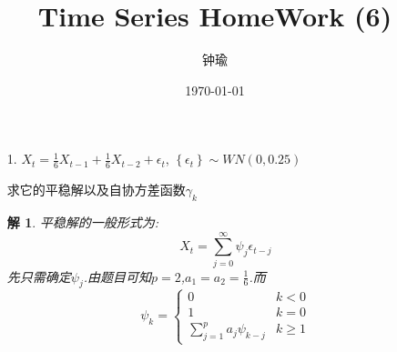 \documentclass[11pt,a4paper]{ctexart}
\title{Time Series HomeWork (6)}
\author{钟瑜 \quad 222018314210044}
\date{\today}
\newtheorem*{solution}{解}
\begin{document}
\maketitle
\pagestyle{plain}%
\begin{enumerate}
	
\item[1.]$ X_t=\frac{1}{6}X_{t-1}+\frac{1}{6}X_{t-2}+\epsilon_t $, $ \left\lbrace \epsilon_t\right\rbrace \sim WN(0,0.25) $

求它的平稳解以及自协方差函数$ \gamma_k $
\begin{solution}
平稳解的一般形式为:
\begin{equation}
X_t=\sum_{j=0}^{\infty}\psi_j\epsilon_{t-j}
\end{equation}
先只需确定$ \psi_j $.由题目可知$ p=2 $,$ a_1=a_2=\frac{1}{6}$.而
\[
\psi_k =
\begin{cases}
	0 &  k<0 \\
	1 &  k=0 \\
	\sum_{j=1}^p a_j \psi_{k-j} & k\geq 1
\end{cases}
\]


\end{solution}
\end{enumerate}
\end{document}
